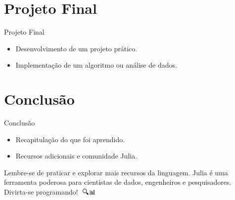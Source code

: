 \documentclass{beamer}
\begin{document}
\section{Projeto Final}
\begin{frame}{Projeto Final}
    \begin{itemize}
        \item Desenvolvimento de um projeto prático.
        \item Implementação de um algoritmo ou análise de dados.
    \end{itemize}
\end{frame}

\section{Conclusão}
\begin{frame}{Conclusão}
    \begin{itemize}
        \item Recapitulação do que foi aprendido.
        \item Recursos adicionais e comunidade Julia.
    \end{itemize}
    
    Lembre-se de praticar e explorar mais recursos da linguagem. Julia é uma ferramenta poderosa para cientistas de dados, engenheiros e pesquisadores. Divirta-se programando! 🚀🔍📊
\end{frame}
\end{document}

